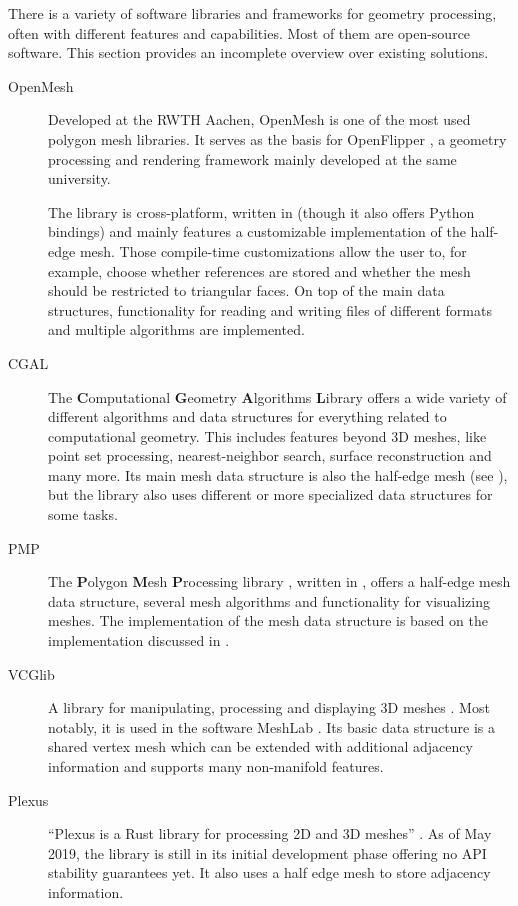 There is a variety of software libraries and frameworks for geometry processing, often with different features and capabilities.
Most of them are open-source software.
This section provides an incomplete overview over existing solutions.

\begin{description}
  \item [OpenMesh] Developed at the RWTH Aachen, OpenMesh \cite{botsch2002openmesh,openmeshhomepage} is one of the most used polygon mesh libraries.
  It serves as the basis for OpenFlipper \cite{mobius2010openflipper, openflipperhomepage}, a geometry processing and rendering framework mainly developed at the same university.

  The library is cross-platform, written in \cpp (though it also offers Python bindings) and mainly features a customizable implementation of the half-edge mesh.
  Those compile-time customizations allow the user to, for example, choose whether  references are stored and whether the mesh should be restricted to triangular faces.
  On top of the main data structures, functionality for reading and writing files of different formats and multiple algorithms are implemented.

  \item [CGAL] The \textbf{C}omputational \textbf{G}eometry \textbf{A}lgorithms \textbf{L}ibrary \cite{cgalhomepage} offers a wide variety of different algorithms and data structures for everything related to computational geometry.
  This includes features beyond 3D meshes, like point set processing, nearest-neighbor search, surface reconstruction and many more.
  Its main mesh data structure is also the half-edge mesh (see \cite{cgal:k-hds-19a, cgal:bsmf-sm-19a}), but the library also uses different or more specialized data structures for some tasks.

  \item [PMP] The \textbf{P}olygon \textbf{M}esh \textbf{P}rocessing library \cite{pmp-library}, written in \cpp, offers a half-edge mesh data structure, several mesh algorithms and functionality for visualizing meshes.
  The implementation of the mesh data structure is based on the  implementation discussed in \cite{sieger2011design}.

  \item [VCGlib] A \cpp library for manipulating, processing and displaying 3D meshes \cite{vcglibhomepage}.
  Most notably, it is used in the software MeshLab \cite{meshlabhomepage}.
  Its basic data structure is a shared vertex mesh which can be extended with additional adjacency information and supports many non-manifold features.

  \item [Plexus] \enquote{Plexus is a Rust library for processing 2D and 3D meshes} \cite{plexus}.
  As of May 2019, the library is still in its initial development phase offering no API stability guarantees yet.
  It also uses a half edge mesh to store adjacency information.
\end{description}


